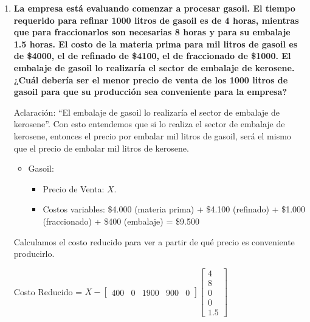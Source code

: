 \documentclass[10pt,a4paper]{article}
\begin{document}
\begin{enumerate}[label=\textbf{\sffamily\large\arabic*.}]
    
    \item {\bfseries\large La empresa está evaluando comenzar a procesar gasoil. El tiempo requerido para refinar 1000 litros de gasoil
    es de 4 horas, mientras que para fraccionarlos son necesarias 8 horas y para su embalaje 1.5 horas. El costo
    de la materia prima para mil litros de gasoil es de \$4000, el de refinado de \$4100, el de fraccionado de \$1000.
    El embalaje de gasoil lo realizaría el sector de embalaje de kerosene. ¿Cuál debería ser el menor precio de
    venta de los 1000 litros de gasoil para que su producción sea conveniente para la empresa?}

    \vspace{1em}

    Aclaración: ``El embalaje de gasoil lo realizaría el sector de embalaje de kerosene''. Con esto entendemos que si lo realiza el sector de embalaje de kerosene, entonces el precio por embalar mil litros de gasoil, será el mismo que el precio de embalar mil litros de kerosene. 


    
    \begin{itemize}

        \item Gasoil:
        \begin{itemize}

            \item Precio de Venta: $X$.
            \item Costos variables: \$4.000 (materia prima) + \$4.100 (refinado) + \$1.000 (fraccionado) + \$400 (embalaje) = \$9.500 \\
        \end{itemize}
\end{itemize}

Calculamos el costo reducido para ver a partir de qué precio es conveniente producirlo. 

   \vspace{1em}

Costo Reducido \: = $X - 
\begin{bmatrix}
400 & 0 & 1900 & 900 & 0
\end{bmatrix}
\begin{bmatrix}
4 \\ 8 \\ 0 \\ 0 \\ 1.5
\end{bmatrix}$ \\



\end{enumerate}
\end{document}
